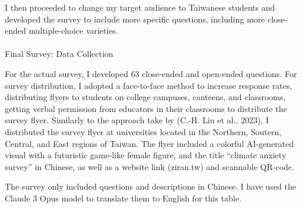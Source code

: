 \documentclass[
  12pt,
  letterpaper,
  DIV=11,
  numbers=noendperiod]{scrartcl}
\makeatletter
\let\oldparagraph\paragraph
\renewcommand{\paragraph}{
    \@ifstar
      \xxxParagraphStar
      \xxxParagraphNoStar
  }
\newcommand{\xxxParagraphStar}[1]{\oldparagraph*{#1}\mbox{}}
\newcommand{\xxxParagraphNoStar}[1]{\oldparagraph{#1}\mbox{}}
\makeatother
\begin{document}
I then proceeded to change my target audience to Taiwanese students and
developed the survey to include more specific questions, including more
close-ended multiple-choice varieties.

\paragraph{Final Survey: Data
Collection}\label{final-survey-data-collection}

For the actual survey, I developed 63 close-ended and open-ended
questions. For survey distribution, I adopted a face-to-face method to
increase response rates, distributing flyers to students on college
campuses, canteens, and classrooms, getting verbal permission from
educators in their classrooms to distribute the survey flyer. Similarly
to the approach take by (C.-H. Liu et al., 2023), I distributed the
survey flyer at universities located in the Northern, Soutern, Central,
and East regions of Taiwan. The flyer included a colorful AI-generated
visual with a futuristic game-like female figure, and the title
``climate anxiety survey'' in Chinese, as well as a website link
(ziran.tw) and scannable QR-code.

The survey only included questions and descriptions in Chinese. I have
used the Claude 3 Opus model to translate them to English for this
table.
\end{document}
